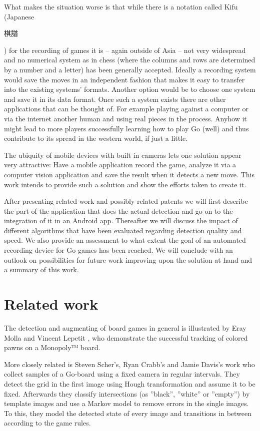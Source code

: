 	What makes the situation worse is that while there is a notation called Kifu (Japanese \begingroup\setmainfont{Droid Sans Japanese}\small\begin{CJK}{UTF8}{min}棋譜\end{CJK}\endgroup ) for the recording of games it is -- again outside of Asia -- not very widespread and no numerical system as in chess (where the columns and rows are determined by a number and a letter) has been generally accepted. Ideally a recording system would save the moves in an independent fashion that makes it easy to transfer into the existing systems' formats. Another option would be to choose one system and save it in its data format. Once such a system exists there are other applications that can be thought of. For example playing against a computer or via the internet another human and using real pieces in the process. Anyhow it might lead to more players successfully learning how to play Go (well) and thus contribute to its spread in the western world, if just a little. %

	The ubiquity of mobile devices with built in cameras lets one solution appear very attractive: Have a mobile application record the game, analyze it via a computer vision application and save the result when it detects a new move. This	work intends to provide such a solution and show the efforts taken to create it.

	After presenting related work and possibly related patents we will first describe the part of the application that does the actual detection and go on to the integration of it in an Android app. Thereafter we will discuss the impact of different algorithms that have been evaluated regarding detection quality and speed. We also provide an assessment to what extent the goal of an automated recording device for Go games has been reached. We will conclude with an outlook on possibilities for future work improving upon the solution at hand and a summary of this work.


	\section{Related work}
	\label{introduction-work}
	The detection and augmenting of board games in general is illustrated by Eray Molla and Vincent Lepetit \cite{molla2010augmented}, who demonstrate the successful tracking of colored pawns on a Monopoly™ board.

	More closely related is  Steven Scher's, Ryan Crabb's and Jamie Davis's work \cite{scher2008making} who collect samples of a Go-board using a fixed camera in regular intervals. They detect the grid in the first image using Hough transformation and assume it to be fixed. Afterwards they classify intersections (as ''black'', ''white'' or ''empty'') by template images and use a Markov model to remove errors in the single images. To this, they model the detected state of every image and transitions in between according to the game rules.

